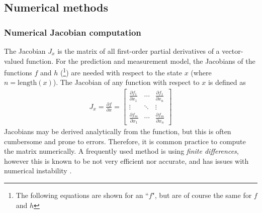 \subsection{Numerical methods}

\subsubsection{Numerical Jacobian computation}
\label{sec:numerical-jacobians}
The Jacobian $J_x$ is the matrix of all first-order partial derivatives of a vector-valued function.
For the prediction and measurement model, the Jacobians of  the functions $f$ and $h$ (\footnote{The following equations are shown for an ``$f$", but are of course the same for $f$ and $h$}) are needed with respect to the state $x$ (where $n = \mathrm{length}(x)$).
The Jacobian of any function with respect to $x$ is defined as \cite{martins2021}
\begin{align}
    J_x = \frac{\partial f}{\partial x}
    = \begin{bmatrix}
        \frac{\partial f_1}{\partial x_1} & \cdots & \frac{\partial f_1}{\partial x_n} \\
        \vdots & \ddots & \vdots \\
        \frac{\partial f_m}{\partial x_1} & \cdots & \frac{\partial f_m}{\partial x_n}
    \end{bmatrix}
\end{align}
Jacobians may be derived analytically from the function, but this is often cumbersome and prone to errors.
Therefore, it is common practice to compute the matrix numerically.
A frequently used method is using \textit{finite differences}, however this is known to be not very efficient nor accurate, and has issues with numerical instability \cite{martins2021}.

